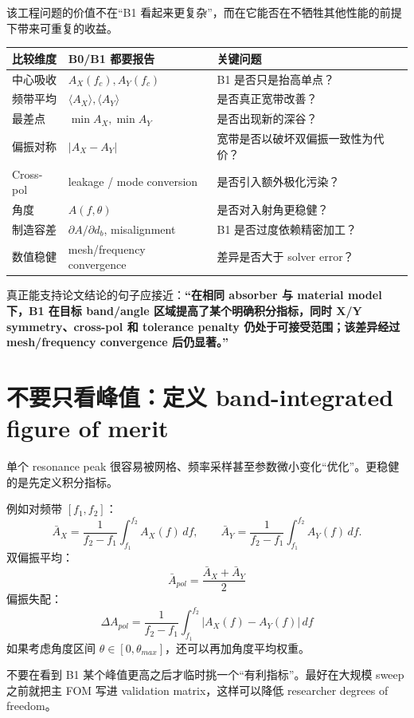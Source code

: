 \documentclass[11pt,a4paper,openany]{ctexrep}
\begin{document}
该工程问题的价值不在“B1 看起来更复杂”，而在它能否在不牺牲其他性能的前提下带来可重复的收益。

\begin{center}
\noindent\begin{tabularx}{\textwidth}{p{3.3cm}X X}
\toprule
比较维度 & B0/B1 都要报告 & 关键问题 \\
\midrule
中心吸收 & $A_X(f_c),A_Y(f_c)$ & B1 是否只是抬高单点？ \\
频带平均 & $\langle A_X\rangle,\langle A_Y\rangle$ & 是否真正宽带改善？ \\
最差点 & $\min A_X,\min A_Y$ & 是否出现新的深谷？ \\
偏振对称 & $|A_X-A_Y|$ & 宽带是否以破坏双偏振一致性为代价？ \\
Cross-pol & leakage / mode conversion & 是否引入额外极化污染？ \\
角度 & $A(f,\theta)$ & 是否对入射角更稳健？ \\
制造容差 & $\partial A/\partial d_b$, misalignment & B1 是否过度依赖精密加工？ \\
数值稳健 & mesh/frequency convergence & 差异是否大于 solver error？ \\
\bottomrule
\end{tabularx}
\end{center}

\begin{projectbox}
真正能支持论文结论的句子应接近：\textbf{“在相同 absorber 与 material model 下，B1 在目标 band/angle 区域提高了某个明确积分指标，同时 X/Y symmetry、cross-pol 和 tolerance penalty 仍处于可接受范围；该差异经过 mesh/frequency convergence 后仍显著。”}
\end{projectbox}

\section{不要只看峰值：定义 band-integrated figure of merit}

单个 resonance peak 很容易被网格、频率采样甚至参数微小变化“优化”。更稳健的是先定义积分指标。

例如对频带 $[f_1,f_2]$：
\[
\bar A_X=\frac{1}{f_2-f_1}\int_{f_1}^{f_2}A_X(f)\,df,
\qquad
\bar A_Y=\frac{1}{f_2-f_1}\int_{f_1}^{f_2}A_Y(f)\,df.
\]
双偏振平均：
\[
\boxed{
\bar A_{pol}=\frac{\bar A_X+\bar A_Y}{2}
}
\]
偏振失配：
\[
\boxed{
\Delta A_{pol}=\frac{1}{f_2-f_1}
\int_{f_1}^{f_2}|A_X(f)-A_Y(f)|\,df
}
\]
如果考虑角度区间 $\theta\in[0,\theta_{max}]$，还可以再加角度平均权重。

\begin{mistakebox}
不要在看到 B1 某个峰值更高之后才临时挑一个“有利指标”。最好在大规模 sweep 之前就把主 FOM 写进 validation matrix，这样可以降低 researcher degrees of freedom。
\end{mistakebox}
\end{document}
